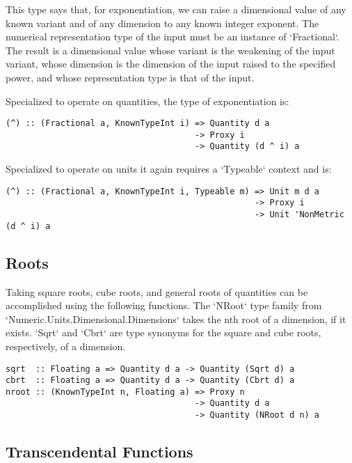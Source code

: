 \documentclass[11pt]{report}
\begin{document}
This type says that, for exponentiation, we can raise a dimensional value of any known variant and of any dimension to any known integer exponent.
The numerical representation type of the input must be an instance of `Fractional`. The result is a dimensional value whose variant is the weakening
of the input variant, whose dimension is the dimension of the input raised to the specified power, and whose representation type is that of the input.

Specialized to operate on quantities, the type of exponentiation is:

\begin{lstlisting}
(^) :: (Fractional a, KnownTypeInt i) => Quantity d a
                                      -> Proxy i
                                      -> Quantity (d ^ i) a
\end{lstlisting}

Specialized to operate on units it again requires a `Typeable` context and is:

\begin{lstlisting}
(^) :: (Fractional a, KnownTypeInt i, Typeable m) => Unit m d a
                                                  -> Proxy i
                                                  -> Unit 'NonMetric (d ^ i) a
\end{lstlisting}

\subsection{Roots}

Taking square roots, cube roots, and general roots of quantities can be accomplished using the following functions.
The `NRoot` type family from `Numeric.Units.Dimensional.Dimensions` takes the nth root of a dimension, if it exists.
`Sqrt` and `Cbrt` are type synonyms for the square and cube roots, respectively, of a dimension.

\begin{lstlisting}
sqrt  :: Floating a => Quantity d a -> Quantity (Sqrt d) a
cbrt  :: Floating a => Quantity d a -> Quantity (Cbrt d) a
nroot :: (KnownTypeInt n, Floating a) => Proxy n
                                      -> Quantity d a
                                      -> Quantity (NRoot d n) a
\end{lstlisting}

\subsection{Transcendental Functions}
\end{document}
